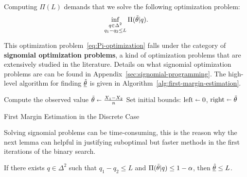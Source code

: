 Computing $\Pi(L)$ demands that we solve the following optimization problem:
\begin{equation}
    \inf_{\substack{q\in\Delta^{2}\\q_1-q_2\leq L}}\Pi(\Tilde{\theta}|q).\label{eq:Pi-optimization}
\end{equation}

This optimization problem~\eqref{eq:Pi-optimization} falls under the category of \textbf{signomial optimization problems}, a kind of optimization problems that are extensively studied in the literature.
Details on what signomial optimization problems are can be found in Appendix~\ref{sec:signomial-programming}.
The high-level algorithm for finding $\underline{\Hat{\theta}}$ is given in Algorithm~\ref{alg:first-margin-estimation}.
\begin{algorithm}[htbp]
    \DontPrintSemicolon %
    Compute the observed value $\Tilde{\theta}\shortleftarrow\frac{X_1-X_2}{n}$\;
    Set initial bounds: $\text{left}\shortleftarrow0$, $\text{right}\shortleftarrow\Tilde{\theta}$ \;
    \caption{First Margin Estimation in the Discrete Case}\label{alg:first-margin-estimation}
\end{algorithm}

Solving signomial problems can be time-consuming, this is the reason why the next lemma can helpful in justifying suboptimal but faster methods in the first iterations of the binary search.
\begin{lemma}
    \label{lemma:suboptimal}
    If there exists $q\in\Delta^{2}$ such that $q_1-q_2\leq L$ and $\Pi(\Tilde{\theta}|q)\leq 1-\alpha$, then $\underline{\Hat{\theta}} \leq L$.
\end{lemma}


